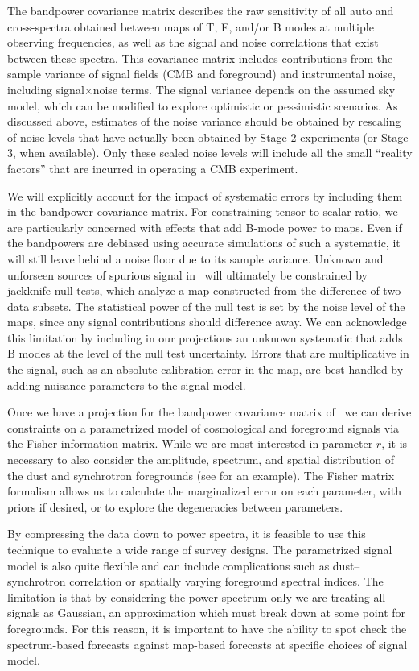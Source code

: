 The bandpower covariance matrix describes the raw sensitivity of all auto and cross-spectra obtained between maps of T, E, and/or B modes at multiple observing frequencies, as well as the signal and noise correlations that exist between these spectra.
This covariance matrix includes contributions from the sample variance of signal fields (CMB and foreground) and instrumental noise, including signal$\times$noise terms.
The signal variance depends on the assumed sky model, which can be modified to explore optimistic or pessimistic scenarios.
As discussed above, estimates of the noise variance should be obtained by rescaling of noise levels that have actually been obtained by Stage 2 experiments (or Stage 3, when available).
Only these scaled noise levels will include all the small ``reality factors'' that are incurred in operating a CMB experiment.

We will explicitly account for the impact of systematic errors by including them in the bandpower covariance matrix.
For constraining tensor-to-scalar ratio, we are particularly concerned with effects that add B-mode power to maps.
Even if the bandpowers are debiased using accurate simulations of such a systematic, it will still leave behind a noise floor due to its sample variance.
Unknown and unforseen sources of spurious signal in \cmbexp\ will ultimately be constrained by jackknife null tests, which analyze a map constructed from the difference of two data subsets.
The statistical power of the null test is set by the noise level of the maps, since any signal contributions should difference away.
We can acknowledge this limitation by including in our projections an unknown systematic that adds B modes at the level of the null test uncertainty.
Errors that are multiplicative in the signal, such as an absolute calibration error in the map, are best handled by adding nuisance parameters to the signal model.

Once we have a projection for the bandpower covariance matrix of \cmbexp\, we can derive constraints on a parametrized model of cosmological and foreground signals via the Fisher information matrix.
While we are most interested in parameter $r$, it is necessary to also consider the amplitude, spectrum, and spatial distribution of the dust and synchrotron foregrounds (see \cite{Ade:2015tva} for an example).
The Fisher matrix formalism allows us to calculate the marginalized error on each parameter, with priors if desired, or to explore the degeneracies between parameters.

By compressing the data down to power spectra, it is feasible to use this technique to evaluate a wide range of survey designs.
The parametrized signal model is also quite flexible and can include complications such as dust--synchrotron correlation or spatially varying foreground spectral indices.
The limitation is that by considering the power spectrum only we are treating all signals as Gaussian, an approximation which must break down at some point for foregrounds.
For this reason, it is important to have the ability to spot check the spectrum-based forecasts against map-based forecasts at specific choices of signal model.

